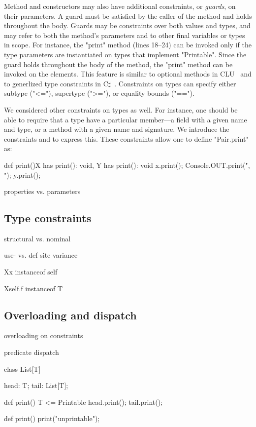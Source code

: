 Method and constructors
may also have additional
constraints, or \emph{guards}, on their parameters.  A
guard must be satisfied by the caller of the method and
holds throughout the body.  Guards may be constraints over both
values and types, and may refer to both the method's parameters
and to other final variables or types in scope.
For instance, the \xcd"print" method (lines 18--24) can be invoked only if
the type parameters are instantiated on types that implement
\xcd"Printable".  Since the guard holds throughout the body of the
method, the \xcd"print" method can be invoked on the elements.
This feature is similar to optional methods in CLU~\cite{clu} and to generlized type constraints in C$\sharp$~\cite{emir06}.
Constraints on types can specify either subtype (\xcd"<="),
supertype (\xcd">="), or equality bounds (\xcd"==").

We considered other constraints on types as well.
For instance, one should
be able to require that a type have a
particular member---a field with a given name and type, or a method
with a given name and signature.
We introduce the constraints 
   and  
 to express this.
These
constraints allow one to define \xcd"Pair.print" as:
\begin{xtenmathnoindent}
  def print(){X has print(): void, Y has print(): void} {
    x.print();
    Console.OUT.print(", ");
    y.print();
  }
\end{xtenmathnoindent}






properties vs. parameters

\subsection{Type constraints}

structural vs. nominal

use- vs. def site variance

X{x instanceof self}

X{self.f instanceof T}


\subsection{Overloading and dispatch}

overloading on constraints

predicate dispatch

\begin{xtennoindent}
class List[T] {
  head: T;
  tail: List[T];

  def print() {T <= Printable} {
    head.print();
    tail.print();
  }

  def print() {
    print("unprintable");
  }
}
\end{xtennoindent}


